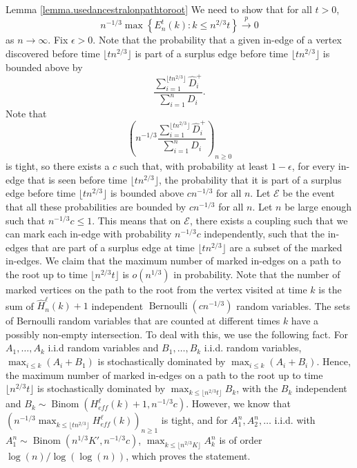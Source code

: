 \begin{proofof}{ Lemma \ref{lemma.usedancestralonpathtoroot}}
We need to show that for all $t>0$, $$n^{-1/3}\max \left\{E^t_n(k):k\leq n^{2/3} t \right\}\overset{p}{\to}0$$ as $n\to \infty$. Fix $\epsilon>0$. Note that the probability that a given in-edge of a vertex discovered before time $\lfloor t n^{2/3}\rfloor$ is part of a surplus edge before time $\lfloor t n^{2/3}\rfloor$ is bounded above by $$\frac{\sum_{i=1}^{\lfloor t n^{2/3}\rfloor} \hat{D}_i^+}{\sum_{i=1}^n D_i}.$$ Note that $$\left(n^{-1/3}\frac{\sum_{i=1}^{\lfloor t n^{2/3}\rfloor} \hat{D}_i^+}{\sum_{i=1}^n D_i}\right)_{n\geq 0}$$ is tight, so there exists a $c$ such that, with probability at least $1-\epsilon$, for every in-edge that is seen before time $\lfloor t n^{2/3}\rfloor$, the probability that it is part of a surplus edge before time $\lfloor t n^{2/3}\rfloor$ is bounded above $cn^{-1/3}$ for all $n$. Let $\mathcal{E}$ be the event that all these probabilities are bounded by $cn^{-1/3}$ for all $n$. Let $n$ be large enough such that $n^{-1/3}c\leq 1$. This means that on $\mathcal{E}$, there exists a coupling such that we can mark each in-edge with probability $n^{-1/3}c$ independently, such that the in-edges that are part of a surplus edge at time $\lfloor tn^{2/3}\rfloor$ are a subset of the marked in-edges. We claim that the maximum number of marked in-edges on a path to the root up to time $\lfloor n^{2/3}t\rfloor$ is $o(n^{1/3})$ in probability. Note that the number of marked vertices on the path to the root from the vertex visited at time $k$ is the sum of $\hat{H}^\ell_n(k)+1$ independent $\operatorname{Bernoulli}(cn^{-1/3})$ random variables. The sets of Bernoulli random variables that are counted at different times $k$ have a possibly non-empty intersection. To deal with this, we use the following fact. For $A_1,\dots, A_k$ i.i.d random variables and $B_1,\dots,B_k$ i.i.d. random variables, $\max_{i\leq k} (A_i+B_1)$ is stochastically dominated by $\max_{i\leq k}(A_i+B_i)$. Hence, the maximum number of marked in-edges on a path to the root up to time $\lfloor n^{2/3}t\rfloor$ is  stochastically dominated by $\max_{k\leq \lfloor n^{2/3} t \rfloor} B_k$, with the $B_k$ independent and $B_k\sim \operatorname{Binom}(H^\ell_{eff}(k)+1,n^{-1/3}c)$. However, we know that $\left(n^{-1/3}\max_{k\leq \lfloor tn^{2/3}\rfloor}H^\ell_{eff}(k)\right)_{n\geq 1}$ is tight, and for $A^n_1,A^n_2,\dots$ i.i.d. with $A^n_1\sim  \operatorname{Binom}(n^{1/3}K',n^{-1/3}c)$,
 $\max_{k\leq \lfloor n^{2/3} K \rfloor}A^n_k$ is of order $\log(n)/\log(\log(n))$, which proves the statement.
\end{proofof}
